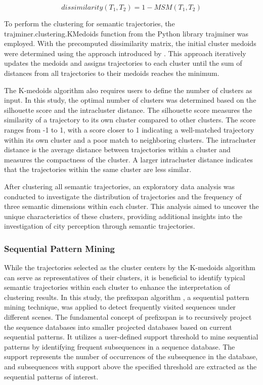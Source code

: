 \documentclass{article}
\theoremstyle{definition}
\theoremstyle{remark}
\begin{document}
\begin{equation} \label{eq:dissimilarity}
    dissimilarity(T_{1},T_{2}) = 1-MSM(T_{1},T_{2})
\end{equation}

To perform the clustering for semantic trajectories, the trajminer.clustering.KMedoids function from the Python library trajminer was employed. With the precomputed dissimilarity matrix, the initial cluster medoids were determined using the approach introduced by \cite{park_simple_2009}. This approach iteratively updates the medoids and assigns trajectories to each cluster until the sum of distances from all trajectories to their medoids reaches the minimum.

The K-medoids algorithm also requires users to define the number of clusters as input. In this study, the optimal number of clusters was determined based on the silhouette score and the intracluster distance. The silhouette score measures the similarity of a trajectory to its own cluster compared to other clusters. The score ranges from -1 to 1, with a score closer to 1 indicating a well-matched trajectory within its own cluster and a poor match to neighboring clusters. The intracluster distance is the average distance between trajectories within a cluster and measures the compactness of the cluster. A larger intracluster distance indicates that the trajectories within the same cluster are less similar.

After clustering all semantic trajectories, an exploratory data analysis was conducted to investigate the distribution of trajectories and the frequency of three semantic dimensions within each cluster. This analysis aimed to uncover the unique characteristics of these clusters, providing additional insights into the investigation of city perception through semantic trajectories.

\subsubsection{Sequential Pattern Mining}
While the trajectories selected as the cluster centers by the K-medoids algorithm can serve as representatives of their clusters, it is beneficial to identify typical semantic trajectories within each cluster to enhance the interpretation of clustering results. In this study, the \acrfull{prefixspan} algorithm \citep{pei_mining_2004}, a sequential pattern mining technique, was applied to detect frequently visited sequences under different scenes. The fundamental concept of \acrshort{prefixspan} is to recursively project the sequence databases into smaller projected databases based on current sequential patterns. It utilizes a user-defined support threshold to mine sequential patterns by identifying frequent subsequences in a sequence database. The support represents the number of occurrences of the subsequence in the database, and subsequences with support above the specified threshold are extracted as the sequential patterns of interest.
\end{document}
